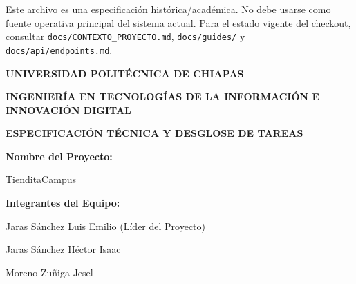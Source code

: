 \documentclass[11pt, letterpaper]{article}
\begin{document}
    
    \begin{tcolorbox}[colback=yellow!10!white,colframe=yellow!40!black,title=Estado del documento]
        Este archivo es una especificaci\'on hist\'orica/acad\'emica. No debe usarse como fuente operativa principal del sistema actual. Para el estado vigente del checkout, consultar \texttt{docs/CONTEXTO\_PROYECTO.md}, \texttt{docs/guides/} y \texttt{docs/api/endpoints.md}.
    \end{tcolorbox}
   
    \begin{titlepage}
        \centering
        \vspace*{1cm}
        
        {\bfseries\LARGE UNIVERSIDAD POLITÉCNICA DE CHIAPAS \par}
        \vspace{1cm}
        {\bfseries\Large INGENIERÍA EN TECNOLOGÍAS DE LA INFORMACIÓN E INNOVACIÓN DIGITAL \par}
        \vspace{2cm}
        
        {\bfseries\Huge ESPECIFICACIÓN TÉCNICA Y DESGLOSE DE TAREAS \par}
        \vspace{2.5cm}
        
        {\Large \textbf{Nombre del Proyecto:} \par}
        \vspace{0.5cm}
        {\Large TienditaCampus \par}
        
        \vspace{2.5cm}
        
        {\large \textbf{Integrantes del Equipo:} \par}
        \vspace{0.4cm}
        {\large Jaras Sánchez Luis Emilio (Líder del Proyecto) \par}
        \vspace{0.2cm}
        {\large Jaras Sánchez Héctor Isaac \par}
        \vspace{0.2cm}
        {\large Moreno Zuñiga Jesel \par}
        
        \vfill
        
    \end{titlepage}
   
\end{document}
